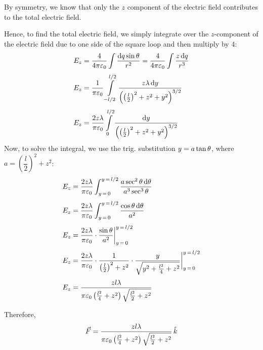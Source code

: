 \documentclass[../main.tex]{subfiles}
\begin{document}
\begin{questions}
\begin{solution}
\begin{center}
	\end{center}

	By symmetry, we know that only the $z$ component of the electric field contributes to the total electric field.

	Hence, to find the total electric field, we simply integrate over the $z$-component of the electric field due to one side of the square loop and then multiply by 4:
	\begin{align}
		E_z &= \dfrac{4}{4\pi\varepsilon_0} \int \dfrac{\mathrm{d} q \sin\theta}{r^2} = \dfrac{4}{4\pi\varepsilon_0} \int \dfrac{z\,\mathrm{d} q}{r^3} \\[3pt]
		E_z &=  \dfrac{1}{\pi\varepsilon_0} \int\limits_{-l/2}^{l/2} \dfrac{z\lambda\,\mathrm{d} y}{\left(\left(\frac{l}{2}\right)^2 + z^2 + y^2\right)^{3/2}} \\[3pt]
		E_z &=  \dfrac{2z\lambda}{\pi\varepsilon_0} \int\limits_{0}^{l/2} \dfrac{\mathrm{d} y}{\left(\left(\frac{l}{2}\right)^2 + z^2 + y^2\right)^{3/2}}
	\end{align}
	Now, to solve the integral, we use the trig. substitution $y = a\tan\theta$, where $a = \left(\dfrac{l}{2}\right)^2 + z^2$:
	\begin{align}
		E_z &=  \dfrac{2z\lambda}{\pi\varepsilon_0} \int_{y\,=\,0}^{y\,=\, l/2} \dfrac{a\sec^2\theta\,\mathrm{d} \theta}{a^3 \sec^3\theta} \\[3pt]
		E_z &=  \dfrac{2z\lambda}{\pi\varepsilon_0} \int_{y\,=\,0}^{y\,=\, l/2} \dfrac{\cos\theta\,\mathrm{d} \theta}{a^2} \\[3pt]
		E_z &=  \dfrac{2z\lambda}{\pi\varepsilon_0}\cdot \dfrac{\sin\theta}{a^2}\bigg|_{y\,=\,0}^{y\,=\, l/2} \\[3pt]
		E_z &=  \dfrac{2z\lambda}{\pi\varepsilon_0}\cdot \dfrac{1}{\left(\frac{l}{2}\right)^2 + z^2}\cdot \dfrac{y}{\sqrt{y^2 + \frac{l^2}{4} + z^2}}\bigg|_{y\,=\,0}^{y\,=\, l/2} \\[3pt]
		E_z &=  \dfrac{zl\lambda}{\pi\varepsilon_0\left(\frac{l^2}{4} + z^2\right)\sqrt{\frac{l^2}{2} + z^2}}
	\end{align}

	Therefore,
	\begin{equation}
		\vec{F} =  \dfrac{zl\lambda}{\pi\varepsilon_0\left(\frac{l^2}{4} + z^2\right)\sqrt{\frac{l^2}{2} + z^2}} \,\hat{k}
	\end{equation}

\end{solution}

\end{questions}
\end{document}
